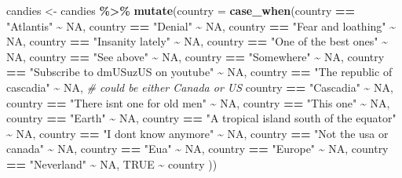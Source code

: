 \documentclass[
]{article}
\newenvironment{Shaded}{\begin{snugshade}}{\end{snugshade}}
\newcommand{\AttributeTok}[1]{\textcolor[rgb]{0.13,0.29,0.53}{#1}}
\newcommand{\CommentTok}[1]{\textcolor[rgb]{0.56,0.35,0.01}{\textit{#1}}}
\newcommand{\ConstantTok}[1]{\textcolor[rgb]{0.56,0.35,0.01}{#1}}
\newcommand{\FunctionTok}[1]{\textcolor[rgb]{0.13,0.29,0.53}{\textbf{#1}}}
\newcommand{\NormalTok}[1]{#1}
\newcommand{\OtherTok}[1]{\textcolor[rgb]{0.56,0.35,0.01}{#1}}
\newcommand{\SpecialCharTok}[1]{\textcolor[rgb]{0.81,0.36,0.00}{\textbf{#1}}}
\newcommand{\StringTok}[1]{\textcolor[rgb]{0.31,0.60,0.02}{#1}}
\begin{document}
\begin{Shaded}
\begin{Highlighting}[]
\NormalTok{candies }\OtherTok{\textless{}{-}}\NormalTok{ candies }\SpecialCharTok{\%\textgreater{}\%} 
  \FunctionTok{mutate}\NormalTok{(}\AttributeTok{country =} \FunctionTok{case\_when}\NormalTok{(country }\SpecialCharTok{==} \StringTok{"Atlantis"} \SpecialCharTok{\textasciitilde{}} \ConstantTok{NA}\NormalTok{,}
\NormalTok{       country }\SpecialCharTok{==} \StringTok{"Denial"} \SpecialCharTok{\textasciitilde{}} \ConstantTok{NA}\NormalTok{,}
\NormalTok{       country }\SpecialCharTok{==} \StringTok{"Fear and loathing"} \SpecialCharTok{\textasciitilde{}} \ConstantTok{NA}\NormalTok{,}
\NormalTok{       country }\SpecialCharTok{==} \StringTok{"Insanity lately"} \SpecialCharTok{\textasciitilde{}} \ConstantTok{NA}\NormalTok{,}
\NormalTok{       country }\SpecialCharTok{==} \StringTok{"One of the best ones"} \SpecialCharTok{\textasciitilde{}} \ConstantTok{NA}\NormalTok{,}
\NormalTok{       country }\SpecialCharTok{==} \StringTok{"See above"} \SpecialCharTok{\textasciitilde{}} \ConstantTok{NA}\NormalTok{,}
\NormalTok{       country }\SpecialCharTok{==} \StringTok{"Somewhere"} \SpecialCharTok{\textasciitilde{}} \ConstantTok{NA}\NormalTok{,}
\NormalTok{       country }\SpecialCharTok{==} \StringTok{"Subscribe to dmUSuzUS on youtube"} \SpecialCharTok{\textasciitilde{}} \ConstantTok{NA}\NormalTok{,}
\NormalTok{       country }\SpecialCharTok{==} \StringTok{"The republic of cascadia"} \SpecialCharTok{\textasciitilde{}} \ConstantTok{NA}\NormalTok{, }\CommentTok{\# could be either Canada or US}
\NormalTok{       country }\SpecialCharTok{==} \StringTok{"Cascadia"} \SpecialCharTok{\textasciitilde{}} \ConstantTok{NA}\NormalTok{,}
\NormalTok{       country }\SpecialCharTok{==} \StringTok{"There isnt one for old men"} \SpecialCharTok{\textasciitilde{}} \ConstantTok{NA}\NormalTok{,}
\NormalTok{       country }\SpecialCharTok{==} \StringTok{"This one"} \SpecialCharTok{\textasciitilde{}} \ConstantTok{NA}\NormalTok{,}
\NormalTok{       country }\SpecialCharTok{==} \StringTok{"Earth"} \SpecialCharTok{\textasciitilde{}} \ConstantTok{NA}\NormalTok{,}
\NormalTok{       country }\SpecialCharTok{==} \StringTok{"A tropical island south of the equator"} \SpecialCharTok{\textasciitilde{}} \ConstantTok{NA}\NormalTok{,}
\NormalTok{       country }\SpecialCharTok{==} \StringTok{"I dont know anymore"} \SpecialCharTok{\textasciitilde{}} \ConstantTok{NA}\NormalTok{,}
\NormalTok{       country }\SpecialCharTok{==} \StringTok{"Not the usa or canada"} \SpecialCharTok{\textasciitilde{}} \ConstantTok{NA}\NormalTok{,}
\NormalTok{       country }\SpecialCharTok{==} \StringTok{"Eua"} \SpecialCharTok{\textasciitilde{}} \ConstantTok{NA}\NormalTok{,}
\NormalTok{       country }\SpecialCharTok{==} \StringTok{"Europe"} \SpecialCharTok{\textasciitilde{}} \ConstantTok{NA}\NormalTok{,}
\NormalTok{       country }\SpecialCharTok{==} \StringTok{"Neverland"} \SpecialCharTok{\textasciitilde{}} \ConstantTok{NA}\NormalTok{,}
       \ConstantTok{TRUE}     \SpecialCharTok{\textasciitilde{}}\NormalTok{ country}
\NormalTok{   ))   }


\end{Highlighting}
\end{Shaded}
\end{document}
